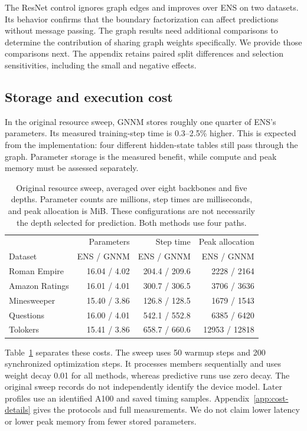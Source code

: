 \documentclass{article}
\begin{document}
The ResNet control ignores graph edges and improves over ENS on two datasets. Its behavior confirms that the boundary factorization can affect predictions without message passing. The graph results need additional comparisons to determine the contribution of sharing graph weights specifically. We provide those comparisons next. The appendix retains paired split differences and selection sensitivities, including the small and negative effects.

\subsection{Storage and execution cost}
In the original resource sweep, GNNM stores roughly one quarter of ENS's parameters. Its measured training-step time is 0.3--2.5\% higher. This is expected from the implementation: four different hidden-state tables still pass through the graph. Parameter storage is the measured benefit, while compute and peak memory must be assessed separately.

\begin{table}[t]
\centering\small
\setlength{\tabcolsep}{4pt}
\caption{Original resource sweep, averaged over eight backbones and five depths. Parameter counts are millions, step times are milliseconds, and peak allocation is MiB. These configurations are not necessarily the depth selected for prediction. Both methods use four paths.}
\label{tab:resource-main}
\begin{tabular}{lrrr}
\toprule
& Parameters & Step time & Peak allocation\\
Dataset & ENS / GNNM & ENS / GNNM & ENS / GNNM\\
\midrule
Roman Empire & 16.04 / 4.02 & 204.4 / 209.6 & 2228 / 2164\\
Amazon Ratings & 16.01 / 4.01 & 300.7 / 306.5 & 3706 / 3636\\
Minesweeper & 15.40 / 3.86 & 126.8 / 128.5 & 1679 / 1543\\
Questions & 16.00 / 4.01 & 542.1 / 552.8 & 6385 / 6420\\
Tolokers & 15.41 / 3.86 & 658.7 / 660.6 & 12953 / 12818\\
\bottomrule
\end{tabular}
\end{table}

Table~\ref{tab:resource-main} separates these costs. The sweep uses 50 warmup steps and 200 synchronized optimization steps. It processes members sequentially and uses weight decay 0.01 for all methods, whereas predictive runs use zero decay. The original sweep records do not independently identify the device model. Later profiles use an identified A100 and saved timing samples. Appendix~\ref{app:cost-details} gives the protocols and full measurements. We do not claim lower latency or lower peak memory from fewer stored parameters.
\end{document}
